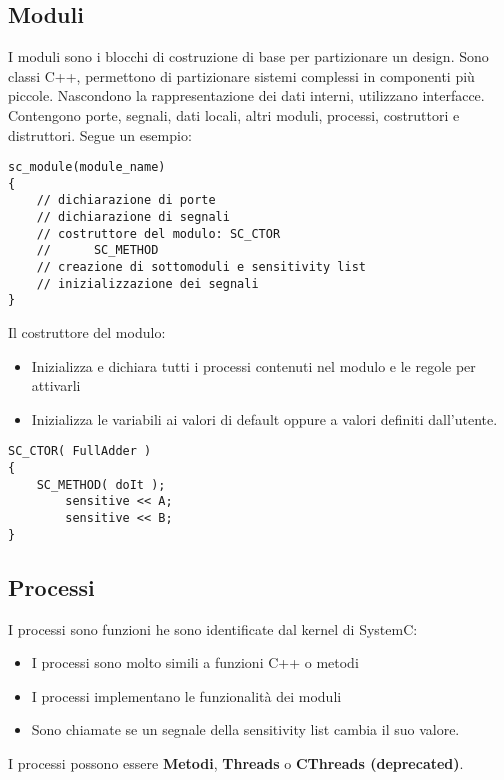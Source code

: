 \documentclass[a4paper]{article}
\begin{document}
		\subsection{Moduli}
			I moduli sono i blocchi di costruzione di base per partizionare un design. Sono classi C++, permettono di partizionare sistemi complessi in componenti più piccole. Nascondono la rappresentazione dei dati interni, utilizzano interfacce. Contengono porte, segnali, dati locali, altri moduli, processi, costruttori e distruttori. Segue un esempio:
		
			\begin{lstlisting}[mathescape, frame=tb, caption={module}]
sc_module(module_name)
{
	// dichiarazione di porte
	// dichiarazione di segnali
	// costruttore del modulo: SC_CTOR
	//		SC_METHOD
	// creazione di sottomoduli e sensitivity list
	// inizializzazione dei segnali
}
			\end{lstlisting}
	
		\noindent
		Il costruttore del modulo:
		\begin{itemize}
			\item Inizializza e dichiara tutti i processi contenuti nel modulo e le regole per attivarli
			\item Inizializza le variabili ai valori di default oppure a valori definiti dall'utente.
		\end{itemize}
		
		\begin{lstlisting}[mathescape, frame=tb, caption={full adder constructor}]
SC_CTOR( FullAdder )
{
	SC_METHOD( doIt );
		sensitive << A;
		sensitive << B;
}
		\end{lstlisting}
		
		\subsection{Processi}
			I processi sono funzioni he sono identificate dal kernel di SystemC:
			\begin{itemize}
				\item I processi sono molto simili a funzioni C++ o metodi
				\item I processi implementano le funzionalità dei moduli
				\item Sono chiamate se un segnale della sensitivity list cambia il suo valore.
			\end{itemize}
			
			\noindent
			I processi possono essere \textbf{Metodi}, \textbf{Threads} o \textbf{CThreads (deprecated)}.
			
\end{document}
